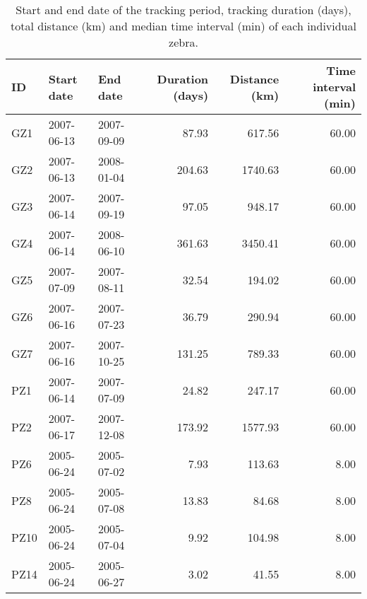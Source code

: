 \begin{table}[H]
\centering
\caption[Tracking summary of each individual, Laikipia]{Start and end date of the tracking period, tracking duration (days), 
                                       total distance (km) and median time interval (min) 
                                       of each individual zebra.} 
\label{table:summary_zebra_move_KEN}
\begin{tabular}{lllrrr}
  \toprule
ID & Start date & End date & Duration (days) & Distance (km) & Time interval (min) \\ 
  \midrule
GZ1 & 2007-06-13 & 2007-09-09 & 87.93 & 617.56 & 60.00 \\ 
  GZ2 & 2007-06-13 & 2008-01-04 & 204.63 & 1740.63 & 60.00 \\ 
  GZ3 & 2007-06-14 & 2007-09-19 & 97.05 & 948.17 & 60.00 \\ 
  GZ4 & 2007-06-14 & 2008-06-10 & 361.63 & 3450.41 & 60.00 \\ 
  GZ5 & 2007-07-09 & 2007-08-11 & 32.54 & 194.02 & 60.00 \\ 
  GZ6 & 2007-06-16 & 2007-07-23 & 36.79 & 290.94 & 60.00 \\ 
  GZ7 & 2007-06-16 & 2007-10-25 & 131.25 & 789.33 & 60.00 \\ 
  PZ1 & 2007-06-14 & 2007-07-09 & 24.82 & 247.17 & 60.00 \\ 
  PZ2 & 2007-06-17 & 2007-12-08 & 173.92 & 1577.93 & 60.00 \\ 
  PZ6 & 2005-06-24 & 2005-07-02 & 7.93 & 113.63 & 8.00 \\ 
  PZ8 & 2005-06-24 & 2005-07-08 & 13.83 & 84.68 & 8.00 \\ 
  PZ10 & 2005-06-24 & 2005-07-04 & 9.92 & 104.98 & 8.00 \\ 
  PZ14 & 2005-06-24 & 2005-06-27 & 3.02 & 41.55 & 8.00 \\ 
   \bottomrule
\end{tabular}
\end{table}
